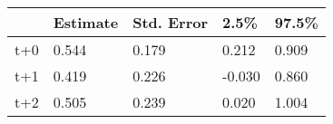 \begin{tabular}{lllll}
  \toprule
  & Estimate & Std. Error & 2.5\% & 97.5\% \\ 
  \midrule
t+0 & 0.544 & 0.179 & 0.212 & 0.909 \\ 
  t+1 & 0.419 & 0.226 & -0.030 & 0.860 \\ 
  t+2 & 0.505 & 0.239 & 0.020 & 1.004 \\ 
   \bottomrule
\end{tabular}
